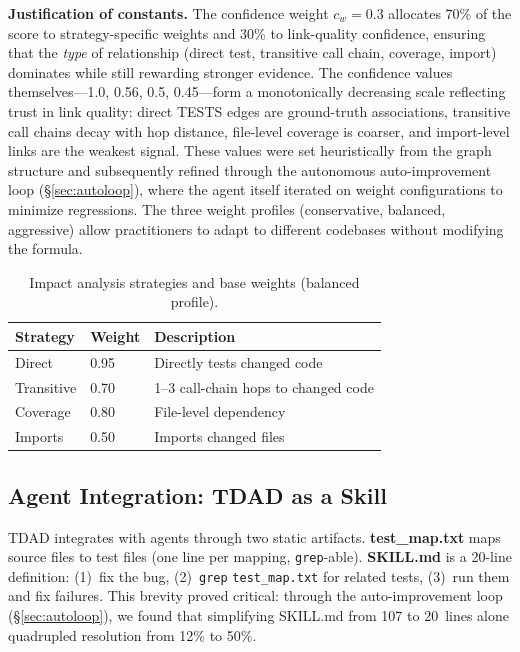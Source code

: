 \documentclass[sigconf,nonacm]{acmart}
\begin{document}
\smallskip\noindent\textbf{Justification of constants.}\enspace
The confidence weight $c_w = 0.3$ allocates 70\% of the score to
strategy-specific weights and 30\% to link-quality confidence, ensuring
that the \emph{type} of relationship (direct test, transitive call chain,
coverage, import) dominates while still rewarding stronger evidence.
The confidence values themselves---1.0, 0.56, 0.5, 0.45---form a
monotonically decreasing scale reflecting trust in link quality: direct
\textsc{TESTS} edges are ground-truth associations, transitive call chains
decay with hop distance, file-level coverage is coarser, and import-level
links are the weakest signal.  These values were set heuristically from
the graph structure and subsequently refined through the autonomous
auto-improvement loop (\S\ref{sec:autoloop}), where the agent itself
iterated on weight configurations to minimize regressions.  The three
weight profiles (conservative, balanced, aggressive) allow practitioners
to adapt to different codebases without modifying the formula.

\begin{table}[t]
\caption{Impact analysis strategies and base weights (balanced profile).}
\label{tab:strategies}
\small
\begin{tabular}{@{}llp{4cm}@{}}
\toprule
\textbf{Strategy} & \textbf{Weight} & \textbf{Description} \\
\midrule
Direct     & 0.95 & Directly tests changed code \\
Transitive & 0.70 & 1--3 call-chain hops to changed code \\
Coverage   & 0.80 & File-level dependency \\
Imports    & 0.50 & Imports changed files \\
\bottomrule
\end{tabular}
\end{table}

\subsection{Agent Integration: TDAD as a Skill}

\textsc{TDAD} integrates with agents through two static artifacts.
\textbf{test\_map.txt} maps source files to test files (one line per
mapping, \texttt{grep}-able).  \textbf{SKILL.md} is a 20-line
definition: (1)~fix the bug, (2)~\texttt{grep}
\texttt{test\_map.txt} for related tests, (3)~run them and fix
failures.  This brevity proved critical: through the auto-improvement
loop (\S\ref{sec:autoloop}), we found that simplifying SKILL.md from
107 to 20~lines alone quadrupled resolution from 12\% to 50\%.
\end{document}
